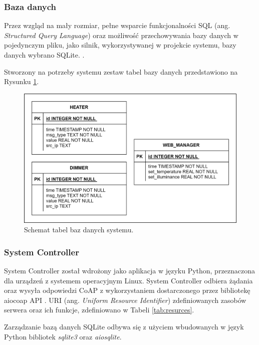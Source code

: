         \subsubsection{Baza danych}
            Przez wzgląd na mały rozmiar, pełne wsparcie funkcjonalności SQL (ang. \textit{Structured Query Language}) oraz możliwość przechowywania bazy danych w pojedynczym pliku, jako silnik, wykorzystywanej w projekcie systemu, bazy danych wybrano SQLite. \cite{sqlite}.

            Stworzony na potrzeby systemu zestaw tabel bazy danych przedstawiono na Rysunku \ref{fig:db-diagram}.

            \begin{figure}[H]
                \centering
                \includegraphics[width=0.8\linewidth]{graphics/db_diagram.png}
                \caption{Schemat tabel baz danych systemu.}
                \label{fig:db-diagram}
            \end{figure}
    
        \subsubsection{System Controller}
    
            System Controller został wdrożony jako aplikacja w języku Python, przeznaczona dla urządzeń z systemem operacyjnym Linux.
            System Controller odbiera żądania oraz wysyła odpowiedzi CoAP z wykorzystaniem dostarczonego przez bibliotekę aiocoap API \cite{aiocoap}. URI (ang. \textit{Uniform Resource Identifier}) zdefiniowanych zasobów serwera oraz ich funkcje, zdefiniowano w Tabeli \ref{tab:resurces}.
            
            Zarządzanie bazą danych SQLite odbywa się z użyciem wbudowanych w język Python bibliotek \textit{sqlite3} oraz \textit{aiosqlite}.


